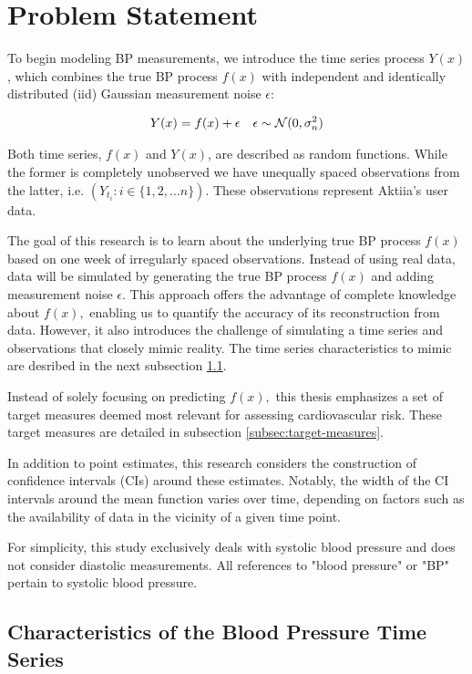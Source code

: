 \section{Problem Statement}\label{sec:problem-statement}

To begin modeling BP measurements, we introduce the time series process $Y(x)$,
which combines the true BP process $f(x)$ with independent and identically
distributed (iid) Gaussian measurement noise $\epsilon$:

\begin{align*}
    Y(x) = f(x) + \epsilon && \epsilon \sim \operatorname{\mathcal{N}}(0, \sigma_n^{2})
\end{align*}

Both time series, $f(x)$ and $Y(x)$, are described as random functions.
While the former is completely unobserved we have
unequally spaced observations from the latter, i.e. $(Y_{t_i}: i \in \{1, 2, \dots n\})$.
These observations represent Aktiia's user data.

The goal of this research is to learn about the underlying true BP process
$f(x)$ based on one week of irregularly spaced observations.
Instead of using real data, data will be simulated by generating the true BP
process $f(x)$ and adding measurement noise $\epsilon$.
This approach offers the advantage of
complete knowledge about $f(x),$ enabling us to quantify the accuracy of its
reconstruction from data. However, it also introduces the challenge of simulating
a time series and observations that closely mimic reality.
The time series characteristics to mimic are desribed in the next subsection
\ref{sec:characteristics-of-the-blood-pressure-time-series}.

Instead of solely focusing on predicting $f(x),$ this thesis emphasizes a set of
target measures deemed most relevant for assessing cardiovascular risk. These
target measures are detailed in subsection \ref{subsec:target-measures}.

In addition to point estimates, this research considers the construction of
confidence intervals (CIs) around these estimates. Notably, the width of the CI
intervals around the mean function varies over time, depending on factors such as
the availability of data in the vicinity of a given time point.

For simplicity, this study exclusively deals with systolic blood pressure and does
not consider diastolic measurements. All references to "blood pressure" or "BP"
pertain to systolic blood pressure.


\subsection{Characteristics of the Blood Pressure Time Series}\label{sec:characteristics-of-the-blood-pressure-time-series}

